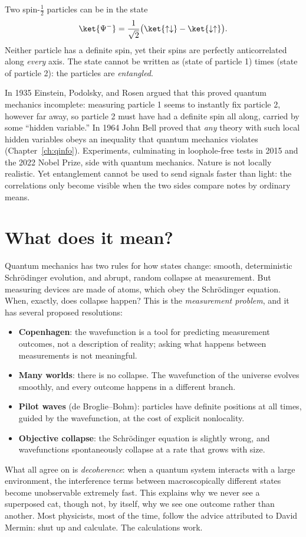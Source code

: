 Two spin-$\tfrac12$ particles can be in the state
\[
  \ket{\Psi^-} = \frac{1}{\sqrt2}\big(\ket{\uparrow\downarrow} - \ket{\downarrow\uparrow}\big).
\]
Neither particle has a definite spin, yet their spins are perfectly anticorrelated along \emph{every} axis. The state cannot be written as (state of particle 1) times (state of particle 2): the particles are \emph{entangled}.

In 1935 Einstein, Podolsky, and Rosen argued that this proved quantum mechanics incomplete: measuring particle 1 seems to instantly fix particle 2, however far away, so particle 2 must have had a definite spin all along, carried by some ``hidden variable.'' In 1964 John Bell proved that \emph{any} theory with such local hidden variables obeys an inequality that quantum mechanics violates (Chapter~\ref{ch:qinfo}). Experiments, culminating in loophole-free tests in 2015 and the 2022 Nobel Prize, side with quantum mechanics. Nature is not locally realistic. Yet entanglement cannot be used to send signals faster than light: the correlations only become visible when the two sides compare notes by ordinary means.

\section{What does it mean?}

Quantum mechanics has two rules for how states change: smooth, deterministic Schr\"odinger evolution, and abrupt, random collapse at measurement. But measuring devices are made of atoms, which obey the Schr\"odinger equation. When, exactly, does collapse happen? This is the \emph{measurement problem}, and it has several proposed resolutions:
\begin{itemize}[itemsep=3pt]
  \item \textbf{Copenhagen}: the wavefunction is a tool for predicting measurement outcomes, not a description of reality; asking what happens between measurements is not meaningful.
  \item \textbf{Many worlds}: there is no collapse. The wavefunction of the universe evolves smoothly, and every outcome happens in a different branch.
  \item \textbf{Pilot waves} (de Broglie--Bohm): particles have definite positions at all times, guided by the wavefunction, at the cost of explicit nonlocality.
  \item \textbf{Objective collapse}: the Schr\"odinger equation is slightly wrong, and wavefunctions spontaneously collapse at a rate that grows with size.
\end{itemize}
What all agree on is \emph{decoherence}: when a quantum system interacts with a large environment, the interference terms between macroscopically different states become unobservable extremely fast. This explains why we never see a superposed cat, though not, by itself, why we see one outcome rather than another. Most physicists, most of the time, follow the advice attributed to David Mermin: shut up and calculate. The calculations work.

